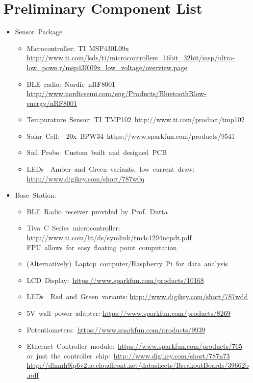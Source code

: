 \documentclass{article}
\begin{document}
\section{Preliminary Component List}
\begin{itemize}
    \item Sensor Package
        \begin{itemize}
            \item Microcontroller: TI MSP430L09x
                \url{http://www.ti.com/lsds/ti/microcontrollers_16­bit_32­bit/msp/ultra­low_powe
                r/msp430l09x_low_voltage/overview.page}
            \item BLE radio: Nordic nRF8001
                \url{http://www.nordicsemi.com/eng/Products/Bluetooth­R­low­energy/nRF8001}
            \item Tempurature Sensor: TI TMP102 http://www.ti.com/product/tmp102
            \item Solar Cell: ~20x BPW34 https://www.sparkfun.com/products/9541
            \item Soil Probe: Custom built and designed PCB
            \item LEDs ­ Amber and Green variants, low current draw:
                \url{http://www.digikey.com/short/787w0q}
        \end{itemize}
    \item Base Station: 
        \begin{itemize}
            \item BLE Radio receiver provided by Prof. Dutta
            \item Tiva C Series microcontroller:
                \url{http://www.ti.com/lit/ds/symlink/tm4c1294ncpdt.pdf}
                FPU allows for easy floating point computation
            \item
                (Alternatively) Laptop computer/Raspberry Pi for data analysis
            \item LCD Display: \url{https://www.sparkfun.com/products/10168}
            \item
                LEDs ­ Red and Green variants:
                \url{http://www.digikey.com/short/787wdd}
            \item 5V wall power adapter:
                \url{https://www.sparkfun.com/products/8269}
            \item Potentiometers: \url{https://www.sparkfun.com/products/9939}
            \item
                Ethernet Controller module: \url{https://www.sparkfun.com/products/765}
                or just the controller chip: \url{http://www.digikey.com/short/787n73}
                \url{http://dlnmh9ip6v2uc.cloudfront.net/datasheets/BreakoutBoards/39662b.pdf}
        \end{itemize}
\end{itemize}
\end{document}
